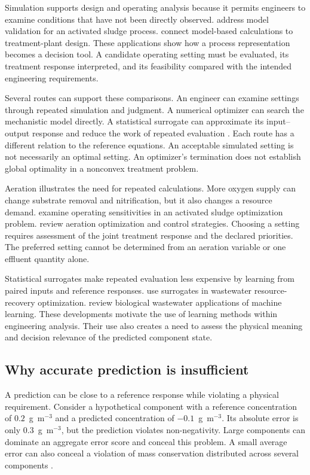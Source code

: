 Simulation supports design and operating analysis because it permits engineers to examine conditions that have not been directly observed. \citet{Calise2020} address model validation for an activated sludge process. \citet{Rivas2008} connect model-based calculations to treatment-plant design. These applications show how a process representation becomes a decision tool. A candidate operating setting must be evaluated, its treatment response interpreted, and its feasibility compared with the intended engineering requirements.

Several routes can support these comparisons. An engineer can examine settings through repeated simulation and judgment. A numerical optimizer can search the mechanistic model directly. A statistical surrogate can approximate its input--output response and reduce the work of repeated evaluation \citep{BhosekarIerapetritou2018,McBride2019}. Each route has a different relation to the reference equations. An acceptable simulated setting is not necessarily an optimal setting. An optimizer's termination does not establish global optimality in a nonconvex treatment problem.

Aeration illustrates the need for repeated calculations. More oxygen supply can change substrate removal and nitrification, but it also changes a resource demand. \citet{Araujo2013} examine operating sensitivities in an activated sludge optimization problem. \citet{Gu2023} review aeration optimization and control strategies. Choosing a setting requires assessment of the joint treatment response and the declared priorities. The preferred setting cannot be determined from an aeration variable or one effluent quantity alone.

Statistical surrogates make repeated evaluation less expensive by learning from paired inputs and reference responses. \citet{Durkin2024} use surrogates in wastewater resource-recovery optimization. \citet{Sundui2021} review biological wastewater applications of machine learning. These developments motivate the use of learning methods within engineering analysis. Their use also creates a need to assess the physical meaning and decision relevance of the predicted component state.

\subsection{Why accurate prediction is insufficient}

A prediction can be close to a reference response while violating a physical requirement. Consider a hypothetical component with a reference concentration of $0.2$~g~m$^{-3}$ and a predicted concentration of $-0.1$~g~m$^{-3}$. Its absolute error is only $0.3$~g~m$^{-3}$, but the prediction violates non-negativity. Large components can dominate an aggregate error score and conceal this problem. A small average error can also conceal a violation of mass conservation distributed across several components \citep{Hansen2024,KircherVotsmeier2025}.

